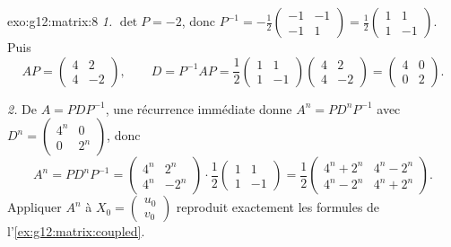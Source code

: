 \begin{solution}{exo:g12:matrix:8}
\emph{1.} $\det P = -2$, donc
$P^{-1} = -\frac12\begin{pmatrix} -1 & -1\\ -1 & 1\end{pmatrix}
= \frac12\begin{pmatrix} 1 & 1\\ 1 & -1\end{pmatrix}$. Puis
\[
AP = \begin{pmatrix} 4 & 2\\ 4 & -2 \end{pmatrix}, \qquad
D = P^{-1}AP = \frac12\begin{pmatrix} 1&1\\1&-1\end{pmatrix}
\begin{pmatrix} 4&2\\4&-2\end{pmatrix}
= \begin{pmatrix} 4 & 0\\ 0 & 2\end{pmatrix}.
\]

\emph{2.} De $A = PDP^{-1}$, une récurrence immédiate donne
$A^n = PD^nP^{-1}$ avec
$D^n = \begin{pmatrix} 4^n & 0\\ 0 & 2^n\end{pmatrix}$, donc
\[
A^n = P D^n P^{-1}
= \begin{pmatrix} 4^n & 2^n\\ 4^n & -2^n\end{pmatrix}\cdot
\frac12\begin{pmatrix} 1&1\\1&-1\end{pmatrix}
= \frac12\begin{pmatrix} 4^n + 2^n & 4^n - 2^n\\
4^n - 2^n & 4^n + 2^n\end{pmatrix}.
\]
Appliquer $A^n$ à $X_0 = \begin{pmatrix} u_0\\v_0\end{pmatrix}$
reproduit exactement les formules de l'\cref{ex:g12:matrix:coupled}.
\end{solution}

